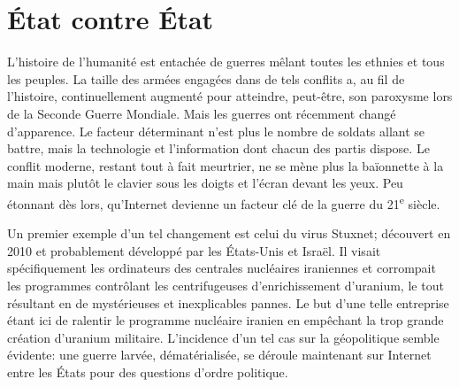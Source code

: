 \documentclass[article, french]{yReport}
\begin{document}
	\section{État contre État}
	L'histoire de l'humanité est entachée de guerres mêlant toutes les ethnies et tous les peuples. La taille des armées engagées dans de tels conflits a, au fil de l'histoire, continuellement augmenté pour atteindre, peut-être, son paroxysme lors de la Seconde Guerre Mondiale. Mais les guerres ont récemment changé d'apparence. Le facteur déterminant n'est plus le nombre de soldats allant se battre, mais la technologie et l'information dont chacun des partis dispose. Le conflit moderne, restant tout à fait meurtrier, ne se mène plus la baïonnette à la main mais plutôt le clavier sous les doigts et l'écran devant les yeux.	Peu étonnant dès lors, qu'Internet devienne un facteur clé de la guerre du 21\textsuperscript{e} siècle.
	
	Un premier exemple d'un tel changement est celui du virus Stuxnet; découvert en 2010 et probablement développé par les États-Unis et Israël. Il visait spécifiquement les ordinateurs des centrales nucléaires iraniennes et corrompait les programmes contrôlant les centrifugeuses d'enrichissement d'uranium, le tout résultant en de mystérieuses et inexplicables pannes. Le but d'une telle entreprise étant ici de ralentir le programme nucléaire iranien en empêchant la trop grande création d'uranium militaire. L'incidence d'un tel cas sur la géopolitique semble évidente: une guerre larvée, dématérialisée, se déroule maintenant sur Internet entre les États pour des questions d'ordre politique.
	
	
\end{document}
